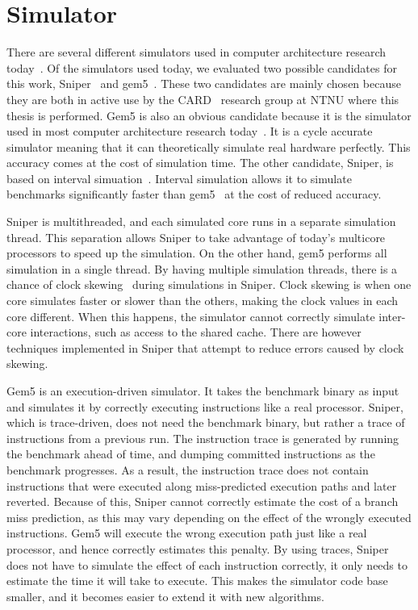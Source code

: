 \section{Simulator}
\label{sec:framework:simulator}

There are several different simulators used in computer architecture research today~\cite{Carlson2011a, Binkert2011, Miller2010, Pellauer2011}.
Of the simulators used today, we evaluated two possible candidates for this work, Sniper~\cite{Carlson2011a} and gem5~\cite{Binkert2011}.
These two candidates are mainly chosen because they are both in active use by the CARD~\cite{CARD2015} research group at NTNU where this thesis is performed.
Gem5 is also an obvious candidate because it is the simulator used in most computer architecture research today~\cite{Chen-Han2014}.
It is a cycle accurate simulator meaning that it can theoretically simulate real hardware perfectly.
This accuracy comes at the cost of simulation time.
The other candidate, Sniper, is based on interval simuation~\cite{Genbrugge2010}. 
Interval simulation allows it to simulate benchmarks significantly faster than gem5~\cite{Carlson2011a, Olsen2014} at the cost of reduced accuracy.

Sniper is multithreaded, and each simulated core runs in a separate simulation thread.
This separation allows Sniper to take advantage of today's multicore processors to speed up the simulation.
On the other hand, gem5 performs all simulation in a single thread.
By having multiple simulation threads, there is a chance of clock skewing~\cite{Carlson2011a} during simulations in Sniper.
Clock skewing is when one core simulates faster or slower than the others, making the clock values in each core different.
When this happens, the simulator cannot correctly simulate inter-core interactions, such as access to the shared cache.
There are however techniques implemented in Sniper that attempt to reduce errors caused by clock skewing.

Gem5 is an execution-driven simulator. 
It takes the benchmark binary as input and simulates it by correctly executing instructions like a real processor.
Sniper, which is trace-driven, does not need the benchmark binary, but rather a trace of instructions from a previous run.
The instruction trace is generated by running the benchmark ahead of time, and dumping committed instructions as the benchmark progresses.
As a result, the instruction trace does not contain instructions that were executed along miss-predicted execution paths and later reverted.
Because of this, Sniper cannot correctly estimate the cost of a branch miss prediction, as this may vary depending on the effect of the wrongly executed instructions.
Gem5 will execute the wrong execution path just like a real processor, and hence correctly estimates this penalty.
By using traces, Sniper does not have to simulate the effect of each instruction correctly, it only needs to estimate the time it will take to execute.
This makes the simulator code base smaller, and it becomes easier to extend it with new algorithms.


